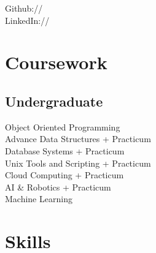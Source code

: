\documentclass[]{deedy-resume-openfont}
\begin{document}
\begin{minipage}[t]{0.33\textwidth}
Github://  \\
LinkedIn://   \\



\section{Coursework}

\subsection{Undergraduate}
Object Oriented Programming \\
Advance Data Structures + Practicum \\
Database Systems + Practicum \\
Unix Tools and Scripting + Practicum \\
Cloud Computing + Practicum \\
AI \& Robotics + Practicum \\
Machine Learning \\

\section{Skills}

\end{minipage}
\end{document}
